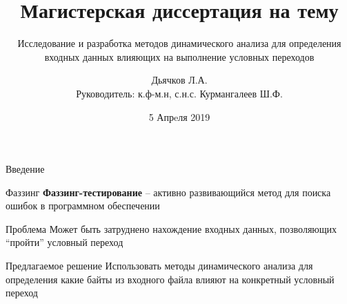 \documentclass[10pt]{beamer}
\title{Магистерская диссертация на тему}
\subtitle{Исследование и разработка методов динамического анализа для определения входных данных влияющих на выполнение условных переходов}
\author{Дьячков Л.А.\\[10mm]{\small Руководитель: к.ф-м.н, с.н.с. Курмангалеев Ш.Ф.}}
\institute{ИСП РАН}
\date{5 Апрeля 2019}
\begin{document}
\maketitle

\begin{frame}{Введение}
  \begin{block}{Фаззинг}
  \textbf{Фаззинг-тестирование} -- активно развивающийся метод для поиска ошибок в программном обеспечении %
  \end{block}
  \pause
  \begin{block}{Проблема}
  Может быть затруднено нахождение входных данных, позволяющих ``пройти'' условный переход
  \end{block}
  \pause
  \begin{block}{Предлагаемое решение}
    Использовать методы динамического анализа для определения какие байты из входного файла влияют на конкретный условный переход
  \end{block}
\end{frame}
\end{document}
